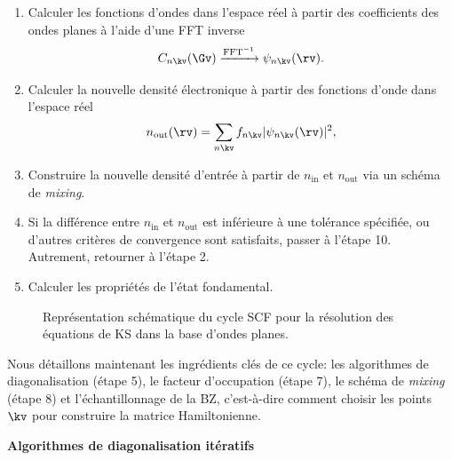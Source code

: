 \begin{enumerate}
    \item Calculer les fonctions d'ondes dans l'espace réel à partir des coefficients des ondes planes à l'aide d'une FFT inverse
    \begin{equation*}
        C_{n\kv}(\Gv)\xrightarrow{\text{FFT}^{-1}}\psi_{n\kv}(\rv).
    \end{equation*}
    \item Calculer la nouvelle densité électronique à partir des fonctions d'onde dans l'espace réel
    \begin{equation*}
        n_\text{out}(\rv)=\sum_{n\kv}f_{n\kv}|\psi_{n\kv}(\rv)|^2,
    \end{equation*}
    \item Construire la nouvelle densité d'entrée à partir de $n_\text{in}$ et $n_\text{out}$ via un schéma de \textit{mixing}.
    \item Si la différence entre $n_\text{in}$ et $n_\text{out}$ est inférieure à une tolérance spécifiée, ou d'autres critères de convergence sont satisfaits, passer à l'étape 10. Autrement, retourner à l'étape 2. 
    \item Calculer les propriétés de l'état fondamental.
\end{enumerate}
\begin{figure}[t]
    \centering
    \hspace{2.5cm}
    
    \caption[Représentation schématique du cycle SCF pour la résolution des équations de KS dans la base d'ondes planes.]{Représentation schématique du cycle SCF pour la résolution des équations de KS dans la base d'ondes planes.}
    \label{fig:scf_PW}
\end{figure}
Nous détaillons maintenant les ingrédients clés de ce cycle: les algorithmes de diagonalisation (étape 5), le facteur d'occupation (étape 7), le schéma de \textit{mixing} (étape 8) et l'échantillonnage de la BZ, c'est-à-dire comment choisir les points $\kv$ pour construire la matrice Hamiltonienne.

\noindent\textbf{Algorithmes de diagonalisation itératifs}

